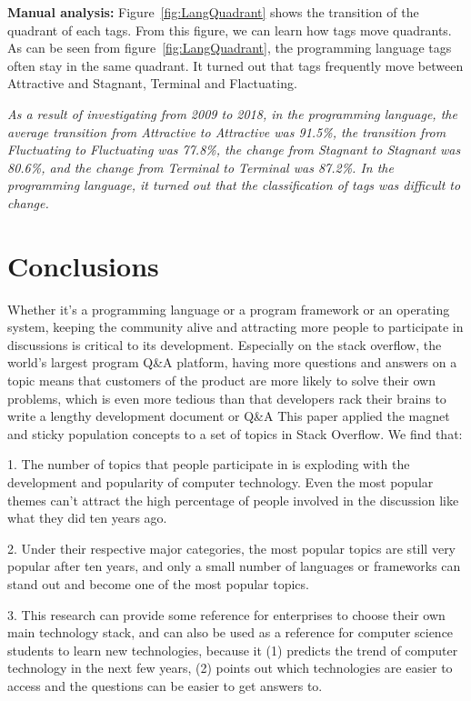 \documentclass[conference]{IEEEtran}
\begin{document}
\textbf{Manual analysis:}
Figure~\ref{fig:LangQuadrant} shows the transition of the quadrant of each tags. From this figure, we can learn how tags move quadrants.
As can be seen from figure~\ref{fig:LangQuadrant}, the programming language tags often stay in the same quadrant. It turned out that tags frequently move between Attractive and Stagnant, Terminal and Flactuating.
\smallskip\smallskip

\begin{oframed}
\emph{As a result of investigating from 2009 to 2018, in the programming language, the average transition from Attractive to Attractive was 91.5\%, the transition from Fluctuating to Fluctuating was 77.8\%, the change from Stagnant to Stagnant was 80.6\%, and the change from Terminal to Terminal was 87.2\%.  In the programming language, it turned out that the classification of tags was difficult to change.}
\end{oframed}

\section{Conclusions}

Whether it's a programming language or a program framework or an operating system, keeping the community alive and attracting more people to participate in discussions is critical to its development. Especially on the stack overflow, the world's largest program Q\&A platform, having more questions and answers on a topic means that customers of the product are more likely to solve their own problems, which is even more tedious than that developers rack their brains to write a lengthy development document or Q\&A This paper applied the magnet and sticky population concepts to a set of topics in Stack Overflow. We find that:

1. The number of topics that people participate in is exploding with the development and popularity of computer technology. Even the most popular themes can't attract the high percentage of people involved in the discussion like what they did ten years ago.
\smallskip\smallskip

2. Under their respective major categories, the most popular topics are still very popular after ten years, and only a small number of languages or frameworks can stand out and become one of the most popular topics.
\smallskip\smallskip

3. This research can provide some reference for enterprises to choose their own main technology stack, and can also be used as a reference for computer science students to learn new technologies, because it (1) predicts the trend of computer technology in the next few years, (2) points out which technologies are easier to access and the questions can be easier to get answers to.\\
\end{document}
